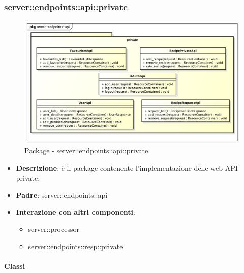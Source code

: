 \subsubsection{server::endpoints::api::private} %
\label{ssub:bdsm_app_server_endpoints_api_private}
\begin{figure}[!htbp]
	\centering
	\centerline{\includegraphics[scale=0.4]{./images/server/api_private.pdf}}
	\caption{Package - server::endpoints::api::private}
\end{figure}

\begin{itemize}
  \item \textbf{Descrizione}: è il package contenente l'implementazione delle web API private;
  \item \textbf{Padre}: server::endpoints::api
  \item \textbf{Interazione con altri componenti}:
  	\begin{itemize}
        \item server::processor
				\item server::endpoints::resp::private
    \end{itemize}
\end{itemize}

	\paragraph{Classi} %

